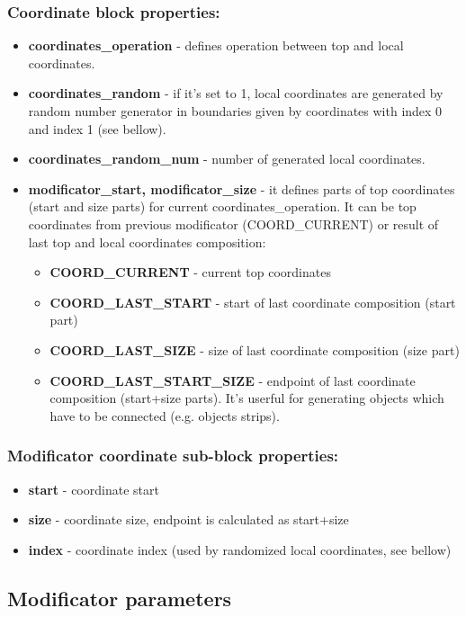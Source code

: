 \documentclass[9pt]{article}
\begin{document}
\subsubsection*{Coordinate block properties:}
\begin{itemize}
\item{\bf coordinates\_operation} - defines operation between top and local coordinates.
\item{\bf coordinates\_random} - if it's set to 1, local coordinates are generated by random number
generator in boundaries given by coordinates with index 0 and index 1 (see bellow).
\item{\bf coordinates\_random\_num} - number of generated local coordinates.    
\item{\bf modificator\_start, modificator\_size} - it defines parts of top 
coordinates (start and size parts) for current coordinates\_operation. 
It can be top coordinates from previous modificator (COORD\_CURRENT) or 
result of last top and local coordinates composition:
\begin{itemize}
\item{\bf COORD\_CURRENT} - current top coordinates
\item{\bf COORD\_LAST\_START} - start of last coordinate composition (start part)
\item{\bf COORD\_LAST\_SIZE} - size of last coordinate composition (size part)
\item{\bf COORD\_LAST\_START\_SIZE} - endpoint of last coordinate composition (start+size parts).
It's userful for generating objects which have to be connected (e.g. objects strips).
\end{itemize}
\end{itemize}
\subsubsection*{Modificator coordinate sub-block properties:}
\begin{itemize}
\item{\bf start} - coordinate start
\item{\bf size} - coordinate size, endpoint is calculated as start+size
\item{\bf index} - coordinate index (used by randomized local coordinates, see bellow)
\end{itemize}

\subsection{Modificator parameters}
\end{document}
